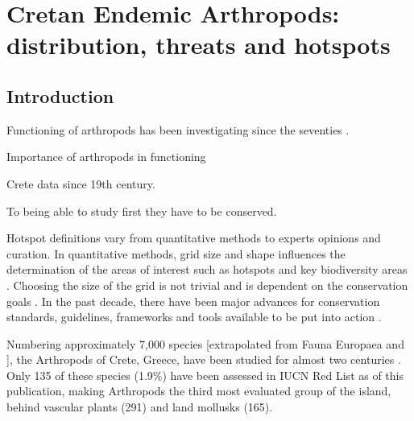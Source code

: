 % 
% 


\chapter{Cretan Endemic Arthropods: distribution, threats and hotspots}
\label{cha:arthropods}

\section{Introduction}
\label{sec:arthropods-intro}

Functioning of arthropods has been investigating since the seventies \parencite{rosswall1997energetical}.

Importance of arthropods in functioning

Crete data since 19th century. 

To being able to study first they have to be conserved.


Hotspot definitions vary from quantitative methods to experts opinions and curation.
In quantitative methods, grid size and shape influences the determination of
the areas of interest such as hotspots and key biodiversity areas \parencite{hurlbert2007species,nhancale2011the-influence}.
Choosing the size of the grid is not trivial \parencite{mo2019influences} and is dependent
on the conservation goals \parencite{margules2000systematic}. In the past decade,
there have been major advances for conservation standards, guidelines,
frameworks and tools available to be put into action \parencite{bongaarts2019ipbes}.


Numbering approximately 7,000 species [extrapolated from Fauna Europaea
\parencite{jong2014fauna} and \textcite{legakis2018}], the Arthropods of Crete, Greece,
have been studied for almost two centuries \parencite{Anastasiou2018Tenebrionid}.
Only 135 of these species (1.9\%) have been assessed in IUCN Red List as of
this publication, making Arthropods the third most evaluated group of the
island, behind vascular plants (291) and land mollusks (165).

